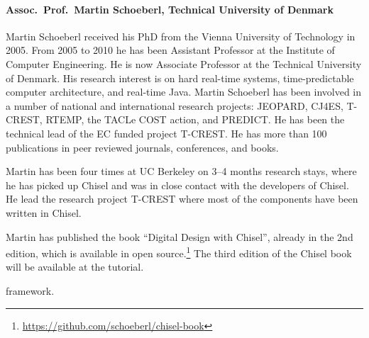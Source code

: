 \documentclass{article}
\begin{document}
 
\paragraph{Assoc.~Prof.~Martin Schoeberl, Technical University of Denmark}

Martin Schoeberl received his PhD from the Vienna University of Technology in 2005. From 2005 to 2010 he has been Assistant Professor at the Institute of Computer Engineering. He is now Associate Professor at the Technical University of Denmark. His research interest is on hard real-time systems, time-predictable computer architecture, and real-time Java.  Martin Schoeberl has been involved in a number of national and international research projects: JEOPARD, CJ4ES, T-CREST, RTEMP, the TACLe COST action, and PREDICT.  He has been the technical lead of the EC funded project T-CREST.  He has more than 100 publications in peer reviewed journals, conferences, and books.

Martin has been four times at UC Berkeley on 3--4 months research stays, where he has picked up Chisel and was in close contact with the developers of Chisel. He lead the research project T-CREST where most of the components have been written in Chisel.

Martin has published the book ``Digital Design with Chisel'', already in the 2nd edition,
which is available in open source.\footnote{\url{https://github.com/schoeberl/chisel-book}}
The third edition of the Chisel book will be available at the tutorial.

%
%
framework.
\end{document}
